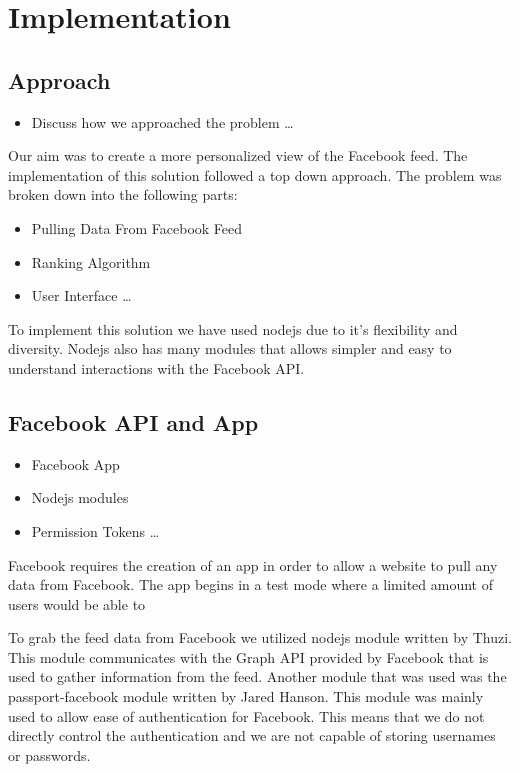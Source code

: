 
\chapter{Implementation}\label{ch:implementation}

\section{Approach}

\begin{itemize}
  \item Discuss how we approached the problem
\ldots
\end{itemize}

Our aim was to create a more personalized view of the Facebook feed. The implementation of this solution followed a top down approach. The problem was broken down into the following parts:

\begin{itemize}
 	\item Pulling Data From Facebook Feed
	\item Ranking Algorithm
  	\item User Interface
\ldots
\end{itemize}

To implement this solution we have used nodejs due to it's flexibility and diversity. Nodejs also has many modules that allows simpler and easy to understand interactions with the Facebook API. 

\section{Facebook API and App}

\begin{itemize}
	\item Facebook App
  	\item Nodejs modules
	\item Permission Tokens
\ldots 
\end{itemize}

Facebook requires the creation of an app in order to allow a website to pull any data from Facebook. The app begins in a test mode where a limited amount of users would be able to 

To grab the feed data from Facebook we utilized nodejs module written by Thuzi. This module communicates with the Graph API provided by Facebook that is used to gather information from the feed. Another module that was used was the passport-facebook module written by Jared Hanson. This module was mainly used to allow ease of authentication for Facebook. This means that we do not directly control the authentication and we are not capable of storing usernames or passwords. 

